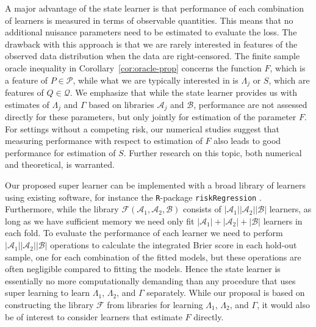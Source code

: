 \documentclass{statsoc}
\numberwithin{theorem}{section}
\newcommand{\1}{\mathds{1}}
\begin{document}
A major advantage of the state learner is that performance of each combination
of learners is measured in terms of observable quantities. This means that no
additional nuisance parameters need to be estimated to evaluate the loss. The
drawback with this approach is that we are rarely interested in features of the
observed data distribution when the data are right-censored. The finite sample
oracle inequality in Corollary~\ref{cor:oracle-prop} concerns the function
\( F \), which is a feature of \( P \in \mathcal{P} \), while what we are
typically interested in is \( \Lambda_j \) or \( S \), which are features of
\( Q \in \mathcal{Q} \). We emphasize that while the state learner provides us
with estimates of \( \Lambda_j \) and $\Gamma$ based on libraries
\( \mathcal{A}_j \) and \( \mathcal{B} \), performance are not assessed directly
for these parameters, but only jointly for estimation of the parameter \( F \).
For settings without a competing risk, our numerical studies suggest that
measuring performance with respect to estimation of \( F \) also leads to good
performance for estimation of \( S \). Further research on this topic, both
numerical and theoretical, is warranted.


Our proposed super learner can be implemented with a broad library of learners
using existing software, for instance the \texttt{R}-package
\texttt{riskRegression} \citep{Gerds_Ohlendorff_Ozenne_2023}. Furthermore, while
the library \( \mathcal{F}(\mathcal{A}_1,\mathcal{A}_2,\mathcal{B}) \) consists
of \( |\mathcal{A}_1||\mathcal{A}_2||\mathcal{B}| \) learners, as long as we
have sufficient memory we need only fit
\( |\mathcal{A}_1| +|\mathcal{A}_2| + |\mathcal{B}| \) learners in each fold. To
evaluate the performance of each learner we need to perform
\( |\mathcal{A}_1||\mathcal{A}_2||\mathcal{B}| \) operations to calculate the
integrated Brier score in each hold-out sample, one for each combination of the
fitted models, but these operations are often negligible compared to fitting the
models. Hence the state learner is essentially no more computationally demanding
than any procedure that uses super learning to learn $\Lambda_1$, $\Lambda_2$,
and $\Gamma$ separately. While our proposal is based on constructing the library
\( \mathcal{F} \) from libraries for learning \( \Lambda_1 \), $\Lambda_2$, and
$\Gamma$, it would also be of interest to consider learners that estimate
\( F \) directly.
\end{document}

